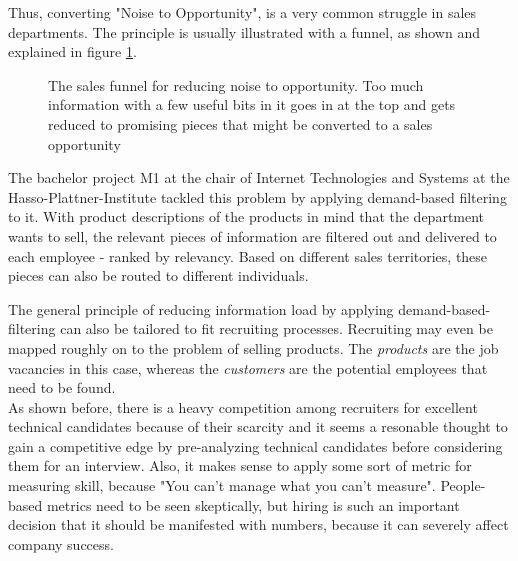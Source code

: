 Thus, converting "Noise to Opportunity", is a very common struggle
in sales departments. The principle is usually illustrated with a funnel,
as shown and explained in figure \ref{fig:sales-funnel}.


\begin{figure}[bth]
    \caption{The sales funnel for reducing noise to opportunity. Too much
    information with a few useful bits in it goes in at the top and gets
    reduced to promising pieces that might be converted to a sales opportunity}
    \label{fig:sales-funnel}
\end{figure}

The bachelor project M1 at the chair of Internet Technologies and Systems
at the Hasso-Plattner-Institute tackled this problem by applying demand-based filtering to it.
With product descriptions of the products in mind that the department wants to sell,
the relevant pieces of information are filtered out and delivered to each employee -
ranked by relevancy. Based on different sales territories,
these pieces can also be routed to different individuals.
\newline


The general principle of reducing information load by applying
demand-based-filtering can also be tailored to fit recruiting processes.
Recruiting may even be mapped roughly on to the problem of selling products.
The \textit{products} are the job vacancies in this case, whereas the
\textit{customers} are the potential employees that need to be found.\\
As shown before, there is a heavy competition among recruiters for excellent
technical candidates because of their scarcity and it seems a resonable thought
to gain a competitive edge by pre-analyzing technical candidates
before considering them for an interview. Also, it makes sense to apply
some sort of metric for measuring skill, because
"You can't manage what you can't measure"\cite{tdm:1986}.  People-based metrics
need to be seen skeptically, but hiring is such an important decision that it
should be manifested with numbers, because it can severely affect
company success\cite{hk:1998}.